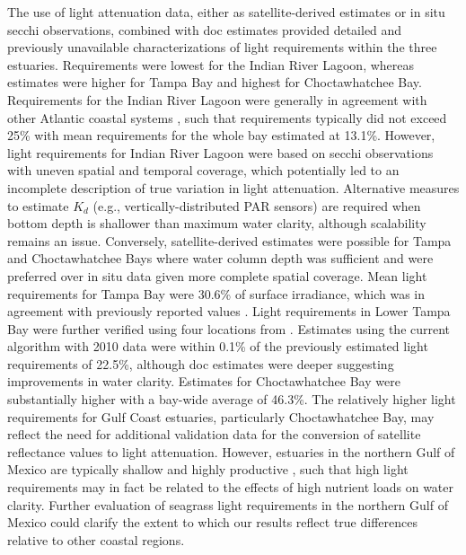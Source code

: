 \documentclass[letterpaper,12pt,oneside]{article}\usepackage[]{graphicx}\usepackage[]{color}
\begin{document}
The use of light attenuation data, either as satellite-derived estimates or in situ secchi observations, combined with \ac{doc} estimates provided detailed and previously unavailable characterizations of light requirements within the three estuaries.  Requirements were lowest for the Indian River Lagoon, whereas estimates were higher for Tampa Bay and highest for Choctawhatchee Bay. Requirements for the Indian River Lagoon were generally in agreement with other Atlantic coastal systems \citep{Dennison93,Kemp04}, such that requirements typically did not exceed 25\% with mean requirements for the whole bay estimated at 13.1\%.  However, light requirements for Indian River Lagoon were based on secchi observations with uneven spatial and temporal coverage, which potentially led to an incomplete description of true variation in light attenuation.  Alternative measures to estimate $K_d$ (e.g., vertically-distributed PAR sensors) are required when bottom depth is shallower than maximum water clarity, although scalability remains an issue.  Conversely, satellite-derived estimates were possible for Tampa and Choctawhatchee Bays where water column depth was sufficient and were preferred over in situ data given more complete spatial coverage. Mean light requirements for Tampa Bay were 30.6\% of surface irradiance, which was in agreement with previously reported values \citep{Dixon95}.  Light requirements in Lower Tampa Bay were further verified using four locations from \citet{Dixon95}.  Estimates using the current algorithm with 2010 data were within 0.1\% of the previously estimated light requirements of 22.5\%, although \ac{doc} estimates were deeper suggesting improvements in water clarity.  Estimates for Choctawhatchee Bay were substantially higher with a bay-wide average of 46.3\%.  The relatively higher light requirements for Gulf Coast estuaries, particularly Choctawhatchee Bay, may reflect the need for additional validation data for the conversion of satellite reflectance values to light attenuation.  However, estuaries in the northern Gulf of Mexico are typically shallow and highly productive \citep{Caffrey14}, such that high light requirements may in fact be related to the effects of high nutrient loads on water clarity.  Further evaluation of seagrass light requirements in the northern Gulf of Mexico could clarify the extent to which our results reflect true differences relative to other coastal regions.
\end{document}
